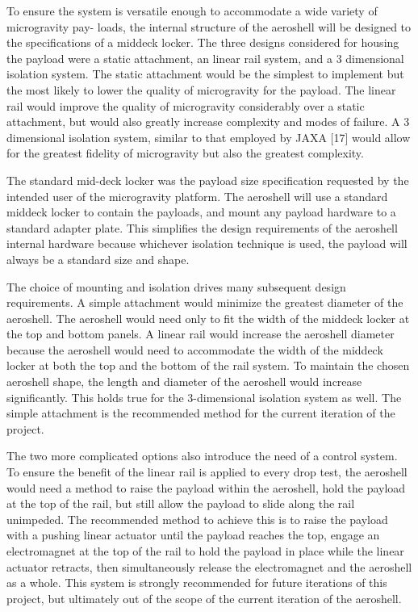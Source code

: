 \indent\indent To ensure the system is versatile enough to accommodate a wide variety of microgravity pay- loads, the internal structure of the aeroshell will be designed to the specifications of a middeck locker. The three designs considered for housing the payload were a static attachment, an linear rail system, and a 3 dimensional isolation system. The static attachment would be the simplest to implement but the most likely to lower the quality of microgravity for the payload. The linear rail would improve the quality of microgravity considerably over a static attachment, but would also greatly increase complexity and modes of failure. A 3 dimensional isolation system, similar to that employed by JAXA [17] would allow for the greatest fidelity of microgravity but also the greatest complexity.

\indent The standard mid-deck locker was the payload size specification requested by the intended user of the microgravity platform. The aeroshell will use a standard middeck locker to contain the payloads, and mount any payload hardware to a standard adapter plate. This simplifies the design requirements of the aeroshell internal hardware because whichever isolation technique is used, the payload will always be a standard size and shape.

\indent The choice of mounting and isolation drives many subsequent design requirements. A simple attachment would minimize the greatest diameter of the aeroshell. The aeroshell would need only to fit the width of the middeck locker at the top and bottom panels. A linear rail would increase the aeroshell diameter because the aeroshell would need to accommodate the width of the middeck locker at both the top and the bottom of the rail system. To maintain the chosen aeroshell shape, the length and diameter of the aeroshell would increase significantly. This holds true for the 3-dimensional isolation system as well. The simple attachment is the recommended method for the current iteration of the project.

\indent The two more complicated options also introduce the need of a control system. To ensure the benefit of the linear rail is applied to every drop test, the aeroshell would need a method to raise the payload within the aeroshell, hold the payload at the top of the rail, but still allow the payload to slide along the rail unimpeded. The recommended method to achieve this is to raise the payload with a pushing linear actuator until the payload reaches the top, engage an electromagnet at the top of the rail to hold the payload in place while the linear actuator retracts, then simultaneously release the electromagnet and the aeroshell as a whole. This system is strongly recommended for future iterations of this project, but ultimately out of the scope of the current iteration of the aeroshell.

